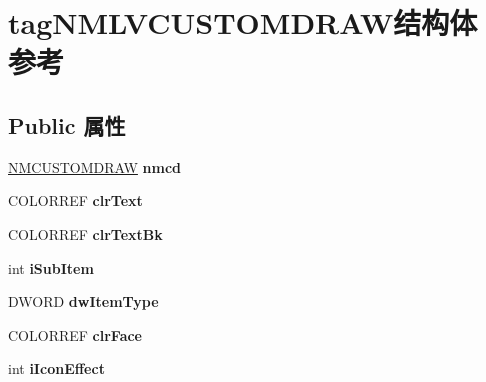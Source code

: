 \hypertarget{structtag_n_m_l_v_c_u_s_t_o_m_d_r_a_w}{}\section{tag\+N\+M\+L\+V\+C\+U\+S\+T\+O\+M\+D\+R\+A\+W结构体 参考}
\label{structtag_n_m_l_v_c_u_s_t_o_m_d_r_a_w}
\subsection*{Public 属性}
\begin{DoxyCompactItemize}
\item 
\mbox{\label{structtag_n_m_l_v_c_u_s_t_o_m_d_r_a_w_a5c0cc843ec7841e28fc1382beb7b248c}} 
\hyperlink{structtag_n_m_c_u_s_t_o_m_d_r_a_w_i_n_f_o}{N\+M\+C\+U\+S\+T\+O\+M\+D\+R\+AW} {\bfseries nmcd}
\item 
\mbox{\label{structtag_n_m_l_v_c_u_s_t_o_m_d_r_a_w_ae91843e8c1dc3cb89ce5a7ea50b42c13}} 
C\+O\+L\+O\+R\+R\+EF {\bfseries clr\+Text}
\item 
\mbox{\label{structtag_n_m_l_v_c_u_s_t_o_m_d_r_a_w_a3c0728cad724a02efd356fab2b951148}} 
C\+O\+L\+O\+R\+R\+EF {\bfseries clr\+Text\+Bk}
\item 
\mbox{\label{structtag_n_m_l_v_c_u_s_t_o_m_d_r_a_w_a848e3c35978946999e13b21658137761}} 
int {\bfseries i\+Sub\+Item}
\item 
\mbox{\label{structtag_n_m_l_v_c_u_s_t_o_m_d_r_a_w_aa1e716ea94cd235d26a817ce8b658324}} 
D\+W\+O\+RD {\bfseries dw\+Item\+Type}
\item 
\mbox{\label{structtag_n_m_l_v_c_u_s_t_o_m_d_r_a_w_a93526d204b948a5717e46bb2db44013d}} 
C\+O\+L\+O\+R\+R\+EF {\bfseries clr\+Face}
\item 
\mbox{\label{structtag_n_m_l_v_c_u_s_t_o_m_d_r_a_w_a47e116a057bbe026f3650a07d4ab5251}} 
int {\bfseries i\+Icon\+Effect}
\item 

\end{DoxyCompactItemize}
